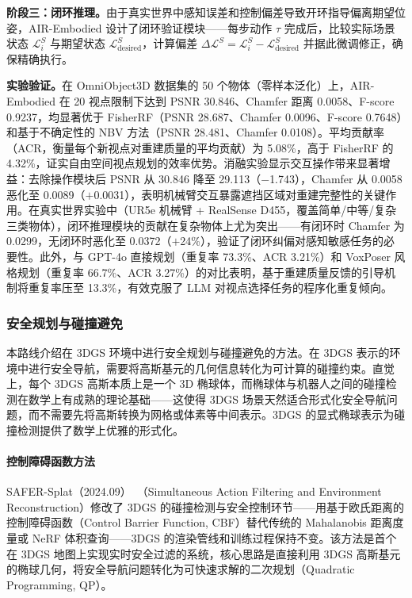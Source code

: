 \textbf{阶段三：闭环推理。}由于真实世界中感知误差和控制偏差导致开环指导偏离期望位姿，AIR-Embodied 设计了闭环验证模块——每步动作 $\tau$ 完成后，比较实际场景状态 $\mathcal{L}_i^S$ 与期望状态 $\mathcal{L}_\text{desired}^S$，计算偏差 $\Delta\mathcal{L}^S = \mathcal{L}_i^S - \mathcal{L}_\text{desired}^S$ 并据此微调修正，确保精确执行。

\textbf{实验验证。}在 OmniObject3D 数据集的 50 个物体（零样本泛化）上，AIR-Embodied 在 20 视点限制下达到 PSNR 30.846、Chamfer 距离 0.0058、F-score 0.9237，均显著优于 FisherRF（PSNR 28.687、Chamfer 0.0096、F-score 0.7648）和基于不确定性的 NBV 方法（PSNR 28.481、Chamfer 0.0108）。平均贡献率（ACR，衡量每个新视点对重建质量的平均贡献）为 5.08\%，高于 FisherRF 的 4.32\%，证实自由空间视点规划的效率优势。消融实验显示交互操作带来显著增益：去除操作模块后 PSNR 从 30.846 降至 29.113（$-$1.743），Chamfer 从 0.0058 恶化至 0.0089（$+$0.0031），表明机械臂交互暴露遮挡区域对重建完整性的关键作用。在真实世界实验中（UR5e 机械臂 + RealSense D455，覆盖简单/中等/复杂三类物体），闭环推理模块的贡献在复杂物体上尤为突出——有闭环时 Chamfer 为 0.0299，无闭环时恶化至 0.0372（$+$24\%），验证了闭环纠偏对感知敏感任务的必要性。此外，与 GPT-4o 直接规划（重复率 73.3\%、ACR 3.21\%）和 VoxPoser 风格规划（重复率 66.7\%、ACR 3.27\%）的对比表明，基于重建质量反馈的引导机制将重复率压至 13.3\%，有效克服了 LLM 对视点选择任务的程序化重复倾向。

\subsubsection{安全规划与碰撞避免}

本路线介绍在 3DGS 环境中进行安全规划与碰撞避免的方法。在 3DGS 表示的环境中进行安全导航，需要将高斯基元的几何信息转化为可计算的碰撞约束。直觉上，每个 3DGS 高斯本质上是一个 3D 椭球体，而椭球体与机器人之间的碰撞检测在数学上有成熟的理论基础——这使得 3DGS 场景天然适合形式化安全导航问题，而不需要先将高斯转换为网格或体素等中间表示。3DGS 的显式椭球表示为碰撞检测提供了数学上优雅的形式化。

\paragraph{控制障碍函数方法}

SAFER-Splat（2024.09）~\cite{2409_09868}（Simultaneous Action Filtering and Environment Reconstruction）修改了 3DGS 的碰撞检测与安全控制环节——用基于欧氏距离的控制障碍函数（Control Barrier Function, CBF）替代传统的 Mahalanobis 距离度量或 NeRF 体积查询——3DGS 的渲染管线和训练过程保持不变。该方法是首个在 3DGS 地图上实现实时安全过滤的系统，核心思路是直接利用 3DGS 高斯基元的椭球几何，将安全导航问题转化为可快速求解的二次规划（Quadratic Programming, QP）。

